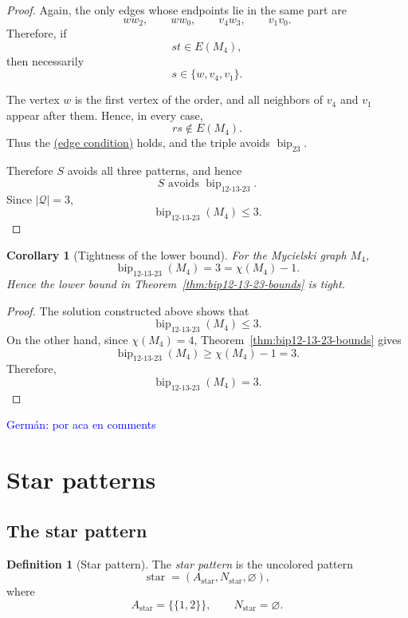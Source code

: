 \documentclass[12pt]{article}
\theoremstyle{plain}
\newtheorem{corollary}[theorem]{Corollary}
\theoremstyle{definition}
\newtheorem{definition}[theorem]{Definition}
\theoremstyle{remark}
\theoremstyle{definition}
\newcommand{\edgecondition}{%
  \hyperref[def:avoid:cond:edge]{(edge condition)}\xspace
}
\newcommand{\starlabel}{\mathrm{star}}
\newcommand{\biplabel}{\mathrm{bip}}
\DeclareRobustCommand{\starname}{%
  \ensuremath{\mathop{\starlabel}\nolimits}%
}
\DeclareRobustCommand{\bipparam}[1]{%
  \ensuremath{\mathop{\biplabel}\nolimits_{#1}}%
}
\newcommand{\german}[1]{%
  \textcolor{blue}{Germán: #1}%
}
\begin{document}
\begin{proof}
Again, the only edges whose endpoints lie in the same part are
\[
ww_2,\qquad
ww_0,\qquad
v_4w_3,\qquad
v_1v_0.
\]
Therefore, if
\[
st\in E(M_4),
\]
then necessarily
\[
s\in\{w,v_4,v_1\}.
\]

The vertex \(w\) is the first vertex of the order, and all neighbors of
\(v_4\) and \(v_1\) appear after them. Hence, in every case,
\[
rs\notin E(M_4).
\]
Thus the \edgecondition{} holds, and the triple avoids
\(\bipparam{23}\).

Therefore \(S\) avoids all three patterns, and hence
\[
S
\text{ avoids }
\bipparam{12\text{-}13\text{-}23}.
\]
Since \(|\mathcal Q|=3\),
\[
\bipparam{12\text{-}13\text{-}23}(M_4)\le3.
\]
\end{proof}




\begin{corollary}[Tightness of the lower bound]
\label{cor:bip12-13-23-lower-bound-tight}
For the Mycielski graph \(M_4\),
\[
\bipparam{12\text{-}13\text{-}23}(M_4)=3=\chi(M_4)-1.
\]
Hence the lower bound in
Theorem~\ref{thm:bip12-13-23-bounds} is tight.
\end{corollary}

\begin{proof}
The solution constructed above shows that
\[
\bipparam{12\text{-}13\text{-}23}(M_4)\le3.
\]
On the other hand, since \(\chi(M_4)=4\),
Theorem~\ref{thm:bip12-13-23-bounds} gives
\[
\bipparam{12\text{-}13\text{-}23}(M_4)
\ge
\chi(M_4)-1
=
3.
\]
Therefore,
\[
\bipparam{12\text{-}13\text{-}23}(M_4)=3.
\]
\end{proof}




\german{por aca en comments}
\section{Star patterns}
\label{sec:star-patterns}

\subsection{The star pattern}
\label{subsec:star-pattern}

\begin{definition}[Star pattern]
The \emph{star pattern} is the uncolored pattern
\[
\starname
=
(A_{\starlabel},N_{\starlabel},\varnothing),
\]
where
\[
A_{\starlabel}
=
\bigl\{\{1,2\}\bigr\},
\qquad
N_{\starlabel}
=
\varnothing.
\]
\end{definition}
\end{document}

